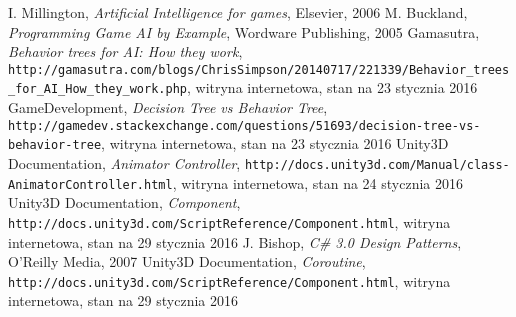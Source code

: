 \begin{thebibliography}{999}
 I. Millington, \emph{Artificial Intelligence for games}, Elsevier, 2006
 M. Buckland, \emph{Programming Game	AI by Example}, Wordware Publishing, 2005
 Gamasutra, \emph{Behavior trees for AI: How they work}, \newline\texttt{http://gamasutra.com/blogs/ChrisSimpson/20140717/221339/Behavior\_trees\_for\newline\_AI\_How\_they\_work.php}, witryna internetowa, stan na 23 stycznia 2016
 GameDevelopment, \emph{Decision Tree vs Behavior Tree}, \newline\texttt{http://gamedev.stackexchange.com/questions/51693/decision-tree-\newline vs-behavior-tree}, witryna internetowa, stan na 23 stycznia 2016
 Unity3D Documentation, \emph{Animator Controller}, \texttt{http://docs.unity3d.com/Manual/\newline class-AnimatorController.html}, witryna internetowa, stan na 24 stycznia 2016
 Unity3D Documentation, \emph{Component}, \newline\texttt{http://docs.unity3d.com/ScriptReference/Component.html}, witryna internetowa, stan na 29 stycznia 2016
 J. Bishop, \emph{C\# 3.0 Design Patterns}, O'Reilly Media, 2007
 Unity3D Documentation, \emph{Coroutine}, \newline\texttt{http://docs.unity3d.com/ScriptReference/Component.html}, witryna internetowa, stan na 29 stycznia 2016
\end{thebibliography}

